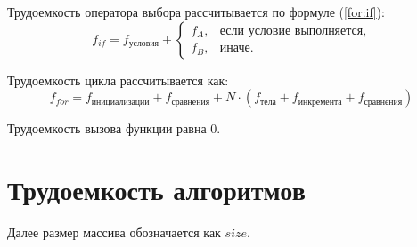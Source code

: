 Трудоемкость оператора выбора  рассчитывается по формуле (\ref{for:if}):
\begin{equation}
	\label{for:if}
	f_{if} = f_{\text{условия}} +
	\begin{cases}
		f_A, & \text{если условие выполняется,}\\
		f_B, & \text{иначе.}
	\end{cases}
\end{equation}

Трудоемкость цикла рассчитывается как:
\begin{equation}
	\label{for:for}
	f_{for} = f_{\text{инициализации}} + f_{\text{сравнения}} + N \cdot (f_{\text{тела}} + f_{\text{инкремента}} + f_{\text{сравнения}})
\end{equation}

Трудоемкость вызова функции равна 0.

\section{Трудоемкость алгоритмов}

Далее размер массива обозначается как $size$.
\pagebreak
